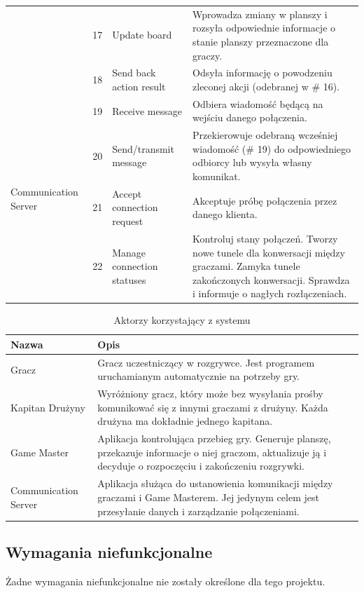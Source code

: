 \documentclass[11pt]{article}
\let\Oldsubsection\subsection
\renewcommand{\subsection}{\FloatBarrier\Oldsubsection}
\begin{document}
\begin{longtable}{|p{}|p{}|p{}|p{}|}
& 17
& Update board
& Wprowadza zmiany w planszy i rozsyła odpowiednie informacje o stanie planszy przeznaczone dla graczy.
\\ \cline{2-4}
& 18
& Send back action result
& Odsyła informację o powodzeniu zleconej akcji (odebranej w \# 16).
\\ \hline
\multirow{4}{.20\textwidth}{Communication Server}
& 19
& Receive message
& Odbiera wiadomość będącą na wejściu danego połączenia.
\\ \cline{2-4}
& 20
& Send/transmit message
& Przekierowuje odebraną wcześniej wiadomość (\# 19) do odpowiedniego odbiorcy lub wysyła własny komunikat.
\\ \cline{2-4}
& 21
& Accept connection request
& Akceptuje próbę połączenia przez danego klienta.
\\ \cline{2-4}
& 22
& Manage connection statuses
& Kontroluj stany połączeń. Tworzy nowe tunele dla konwersacji między graczami. Zamyka tunele zakończonych konwersacji. Sprawdza i informuje o nagłych rozłączeniach.
\\ \hline
\end{longtable}
\FloatBarrier

\begin{longtable}[!h]{|p{}|p{}|}
\caption{Aktorzy korzystający z systemu}
\\ \hline
Nazwa 
& Opis 
\\ \hline
Gracz 
& Gracz uczestniczący w rozgrywce. Jest programem uruchamianym automatycznie na potrzeby gry. 
\\ \hline
Kapitan Drużyny 
& Wyróżniony gracz, który może bez wysyłania prośby komunikować się z innymi graczami z drużyny. Każda drużyna ma dokładnie jednego kapitana. 
\\ \hline
Game Master
& Aplikacja kontrolująca przebieg gry. Generuje planszę, przekazuje informacje o niej graczom, aktualizuje ją i decyduje o rozpoczęciu i zakończeniu rozgrywki.
\\ \hline
Communication Server
& Aplikacja służąca do ustanowienia komunikacji między graczami i Game Masterem. Jej jedynym celem jest przesyłanie danych i zarządzanie połączeniami.
\end{longtable}
\FloatBarrier

\subsection{Wymagania niefunkcjonalne}
\par
Żadne wymagania niefunkcjonalne nie zostały określone dla tego projektu.
\end{document}
